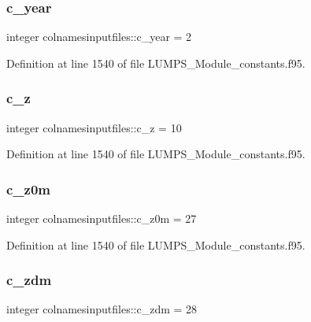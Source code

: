 \subsubsection{\texorpdfstring{c\+\_\+year}{c\_year}}
{\footnotesize\ttfamily integer colnamesinputfiles\+::c\+\_\+year = 2}



Definition at line 1540 of file L\+U\+M\+P\+S\+\_\+\+Module\+\_\+constants.\+f95.

\mbox{\label{namespacecolnamesinputfiles_af04de24c8940348bbdc10a583bbf396d}} 
\subsubsection{\texorpdfstring{c\+\_\+z}{c\_z}}
{\footnotesize\ttfamily integer colnamesinputfiles\+::c\+\_\+z = 10}



Definition at line 1540 of file L\+U\+M\+P\+S\+\_\+\+Module\+\_\+constants.\+f95.

\mbox{\label{namespacecolnamesinputfiles_a62828c78b2fe19453ad737c07573f84f}} 
\subsubsection{\texorpdfstring{c\+\_\+z0m}{c\_z0m}}
{\footnotesize\ttfamily integer colnamesinputfiles\+::c\+\_\+z0m = 27}



Definition at line 1540 of file L\+U\+M\+P\+S\+\_\+\+Module\+\_\+constants.\+f95.

\mbox{\label{namespacecolnamesinputfiles_a74c3c42fe4df332569127f74ce478491}} 
\subsubsection{\texorpdfstring{c\+\_\+zdm}{c\_zdm}}
{\footnotesize\ttfamily integer colnamesinputfiles\+::c\+\_\+zdm = 28}



